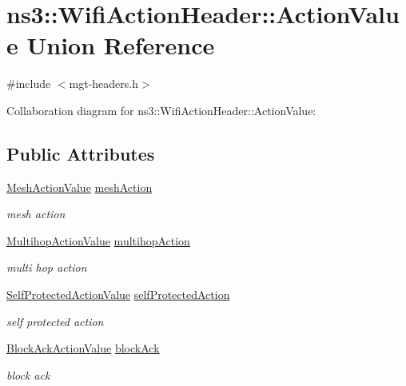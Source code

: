 \hypertarget{unionns3_1_1WifiActionHeader_1_1ActionValue}{}\section{ns3\+:\+:Wifi\+Action\+Header\+:\+:Action\+Value Union Reference}
\label{unionns3_1_1WifiActionHeader_1_1ActionValue}


{\ttfamily \#include $<$mgt-\/headers.\+h$>$}



Collaboration diagram for ns3\+:\+:Wifi\+Action\+Header\+:\+:Action\+Value\+:
\subsection*{Public Attributes}
\begin{DoxyCompactItemize}
\item 
\hyperlink{classns3_1_1WifiActionHeader_a7dec260ba924574c5abb38c1d8a562b1}{Mesh\+Action\+Value} \hyperlink{unionns3_1_1WifiActionHeader_1_1ActionValue_ae28d7dc1b43544a07e1a4acb0d4b5299}{mesh\+Action}
\begin{DoxyCompactList}\small\item\em mesh action \end{DoxyCompactList}\item 
\hyperlink{classns3_1_1WifiActionHeader_a008169268615fdeffe18e6849754fcee}{Multihop\+Action\+Value} \hyperlink{unionns3_1_1WifiActionHeader_1_1ActionValue_a5fc3ee9eb98f346419d6fa9999de0e62}{multihop\+Action}
\begin{DoxyCompactList}\small\item\em multi hop action \end{DoxyCompactList}\item 
\hyperlink{classns3_1_1WifiActionHeader_a17cfd6c8f685a44e7b7b832cc9a53e83}{Self\+Protected\+Action\+Value} \hyperlink{unionns3_1_1WifiActionHeader_1_1ActionValue_a5ed6e759e6f6c4a6d1494f852a12231d}{self\+Protected\+Action}
\begin{DoxyCompactList}\small\item\em self protected action \end{DoxyCompactList}\item 
\hyperlink{classns3_1_1WifiActionHeader_a575d216d28074b8e5fc25d17692f6962}{Block\+Ack\+Action\+Value} \hyperlink{unionns3_1_1WifiActionHeader_1_1ActionValue_afdc4ac41286c47aea6f9ff41649f0254}{block\+Ack}
\begin{DoxyCompactList}\small\item\em block ack \end{DoxyCompactList}\end{DoxyCompactItemize}



